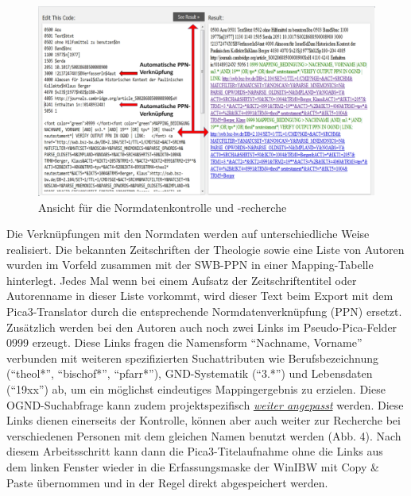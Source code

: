 \documentclass[a4paper,
fontsize=11pt,
oneside,
numbers=noperiodatend,
parskip=half-,
bibliography=totoc,
final
]{scrartcl}
\begin{document}
\begin{figure}[htbp]
\centering
\includegraphics{img/Normdatenkontrolle.jpg}
\caption{Ansicht für die Normdatenkontrolle und -recherche}
\end{figure}

Die Verknüpfungen mit den Normdaten werden auf unterschiedliche Weise
realisiert. Die bekannten Zeitschriften der Theologie sowie eine Liste
von Autoren wurden im Vorfeld zusammen mit der SWB-PPN in einer
Mapping-Tabelle hinterlegt. Jedes Mal wenn bei einem Aufsatz der
Zeitschriftentitel oder Autorenname in dieser Liste vorkommt, wird
dieser Text beim Export mit dem Pica3-Translator durch die entsprechende
Normdatenverknüpfung (PPN) ersetzt. Zusätzlich werden bei den Autoren
auch noch zwei Links im Pseudo-Pica-Felder 0999 erzeugt. Diese Links
fragen die Namensform \enquote{Nachname, Vorname} verbunden mit weiteren
spezifizierten Suchattributen wie Berufsbezeichnung (\enquote{theol*},
\enquote{bischof*}, \enquote{pfarr*}), GND-Systematik (\enquote{3.*})
und Lebensdaten (\enquote{19xx}) ab, um ein möglichst eindeutiges
Mappingergebnis zu erzielen. Diese OGND-Suchabfrage kann zudem
projektspezifisch
\href{https://github.com/UB-Mannheim/zotkat/wiki/Suche-nach-Autoren-Normdaten-im-Online-GND-(OGND)-Katalog}{\emph{weiter
angepasst}} werden. Diese Links dienen einerseits der Kontrolle, können
aber auch weiter zur Recherche bei verschiedenen Personen mit dem
gleichen Namen benutzt werden (Abb. 4). Nach diesem Arbeitsschritt kann
dann die Pica3-Titelaufnahme ohne die Links aus dem linken Fenster
wieder in die Erfassungsmaske der WinIBW mit Copy \& Paste übernommen
und in der Regel direkt abgespeichert werden.
\end{document}
